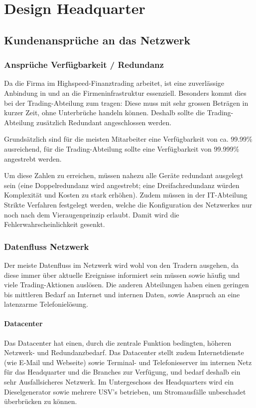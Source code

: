 \section{Design Headquarter}

\subsection{Kundenansprüche an das Netzwerk}

\subsubsection{Ansprüche Verfügbarkeit / Redundanz }
Da die Firma im Highspeed-Finanztrading arbeitet, ist eine zuverlässige Anbindung in und an die Firmeninfrastruktur essenziell. Besonders kommt dies bei der Trading-Abteilung zum tragen: Diese muss mit sehr grossen Beträgen in kurzer Zeit, ohne Unterbrüche handeln können. Deshalb sollte die Trading-Abteilung zusätzlich Redundant angeschlossen werden.

Grundsätzlich sind für die meisten Mitarbeiter eine Verfügbarkeit von ca. 99.99\% ausreichend, für die Trading-Abteilung sollte eine Verfügbarkeit von 99.999\% angestrebt werden.

Um diese Zahlen zu erreichen, müssen nahezu alle Geräte redundant ausgelegt sein (eine Doppelredundanz wird angestrebt; eine Dreifachredundanz würden Komplexität und Kosten zu stark erhöhen). Zudem müssen in der IT-Abteilung Strikte Verfahren festgelegt werden, welche die Konfiguration des Netzwerkes nur noch nach dem Vieraugenprinzip erlaubt. Damit wird die Fehlerwahrscheinlichkeit gesenkt.

\subsubsection{Datenfluss Netzwerk}

Der meiste Datenfluss im Netzwerk wird wohl von den Tradern ausgehen, da diese immer über aktuelle Ereignisse informiert sein müssen sowie häufig und viele Trading-Aktionen auslösen. Die anderen Abteilungen haben einen geringen bis mittleren Bedarf an Internet und internen Daten, sowie Anspruch an eine latenzarme Telefonielösung.

\paragraph{Datacenter}
Das Datacenter hat einen, durch die zentrale Funktion bedingten, höheren Netzwerk- und Redundanzbedarf. Das Datacenter stellt zudem Internetdienste (wie E-Mail und Webseite) sowie Terminal- und Telefonieserver im internen Netz für das Headquarter und die Branches zur Verfügung, und bedarf deshalb ein sehr Ausfallsicheres Netzwerk. Im Untergeschoss des Headquarters wird ein Dieselgenerator sowie mehrere USV's betrieben, um Stromausfälle unbeschadet überbrücken zu können. 

